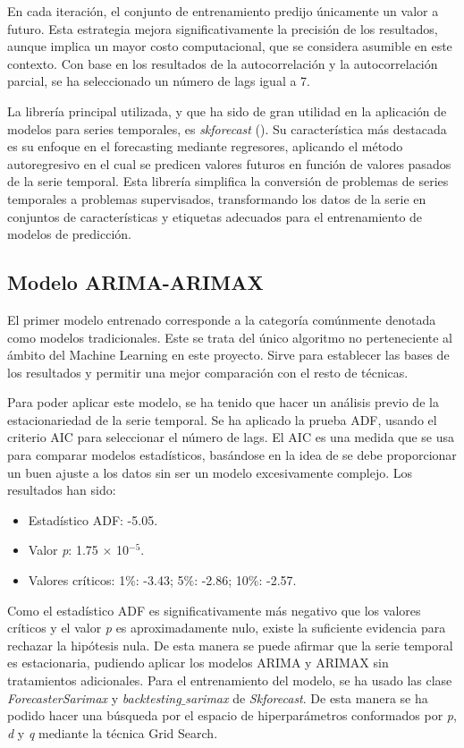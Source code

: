 \documentclass[12pt,a4paper]{report}
\begin{document}
En cada iteración, el conjunto de entrenamiento predijo únicamente un valor a futuro. Esta estrategia mejora significativamente la precisión de los resultados, aunque implica un mayor costo computacional, que se considera asumible en este contexto. Con base en los resultados de la autocorrelación y la autocorrelación parcial, se ha seleccionado un número de lags igual a 7.

La librería principal utilizada, y que ha sido de gran utilidad en la aplicación de modelos para series temporales, es \textit{skforecast} (\cite{skforecast}). Su característica más destacada es su enfoque en el forecasting mediante regresores, aplicando el método autoregresivo en el cual se predicen valores futuros en función de valores pasados de la serie temporal. Esta librería simplifica la conversión de problemas de series temporales a problemas supervisados, transformando los datos de la serie en conjuntos de características y etiquetas adecuados para el entrenamiento de modelos de predicción.


\subsection{Modelo ARIMA-ARIMAX}

El primer modelo entrenado corresponde a la categoría comúnmente denotada como modelos tradicionales. Este se trata del único algoritmo no perteneciente al ámbito del Machine Learning en este proyecto. Sirve para establecer las bases de los resultados y permitir una mejor comparación con el resto de técnicas.

Para poder aplicar este modelo, se ha tenido que hacer un análisis previo de la estacionariedad de la serie temporal. Se ha aplicado la prueba ADF, usando el criterio AIC para seleccionar el número de lags. El AIC es una medida que se usa para comparar modelos estadísticos, basándose en la idea de se debe proporcionar un buen ajuste a los datos sin ser un modelo excesivamente complejo. Los resultados han sido:

\begin{itemize}
    \item Estadístico ADF: -5.05.
    \item Valor \textit{p}: 1.75 $\times$ 10$^{-5}$.
    \item Valores críticos: 1$\%$: -3.43; 5$\%$: -2.86; 10$\%$: -2.57.
\end{itemize}

Como el estadístico ADF es significativamente más negativo que los valores críticos y el valor \textit{p} es aproximadamente nulo, existe la suficiente evidencia para rechazar la hipótesis nula. De esta manera se puede afirmar que la serie temporal es estacionaria, pudiendo aplicar los modelos ARIMA y ARIMAX sin tratamientos adicionales. Para el entrenamiento del modelo, se ha usado las clase \textit{ForecasterSarimax} y \textit{backtesting$\_$sarimax} de \textit{Skforecast}. De esta manera se ha podido hacer una búsqueda por el espacio de hiperparámetros conformados por \textit{p}, \textit{d} y \textit{q} mediante la técnica Grid Search. 
\end{document}
